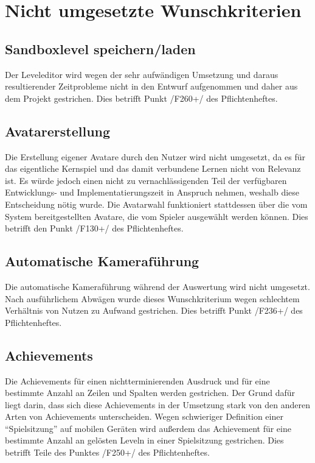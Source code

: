 \chapter{Nicht umgesetzte Wunschkriterien}

\section{Sandboxlevel speichern/laden}
	Der Leveleditor wird wegen der sehr aufwändigen Umsetzung und daraus resultierender Zeitprobleme 
nicht in den Entwurf aufgenommen und daher aus dem Projekt gestrichen.
Dies betrifft Punkt /F260+/ des Pflichtenheftes.  
 
\section{Avatarerstellung}
Die Erstellung eigener Avatare durch den Nutzer wird  nicht umgesetzt, da es für das eigentliche Kernspiel und das damit verbundene Lernen nicht von Relevanz ist.
Es würde jedoch einen nicht zu vernachlässigenden Teil der verfügbaren Entwicklungs- und Implementatierungszeit in Anspruch nehmen, weshalb diese Entscheidung nötig wurde.
Die Avatarwahl funktioniert stattdessen über die vom System bereitgestellten Avatare, die vom Spieler ausgewählt werden können.
Dies betrifft den Punkt /F130+/ des Pflichtenheftes.  

\section{Automatische Kameraführung}
Die automatische Kameraführung während der Auswertung wird nicht umgesetzt.
Nach ausführlichem Abwägen wurde dieses Wunschkriterium wegen schlechtem Verhältnis von Nutzen zu Aufwand gestrichen.
Dies betrifft Punkt /F236+/ des Pflichtenheftes. 

\section{Achievements}
Die Achievements für einen nichtterminierenden Ausdruck und für eine bestimmte Anzahl an Zeilen und Spalten werden gestrichen.
Der Grund dafür liegt darin, dass sich diese Achievements in der Umsetzung stark von den anderen Arten von Achievements unterscheiden.
Wegen schwieriger Definition einer "`Spielsitzung"' auf mobilen Geräten wird außerdem das Achievement für eine bestimmte Anzahl an gelösten Leveln in einer Spielsitzung gestrichen.
Dies betrifft Teile des Punktes /F250+/ des Pflichtenheftes.  
